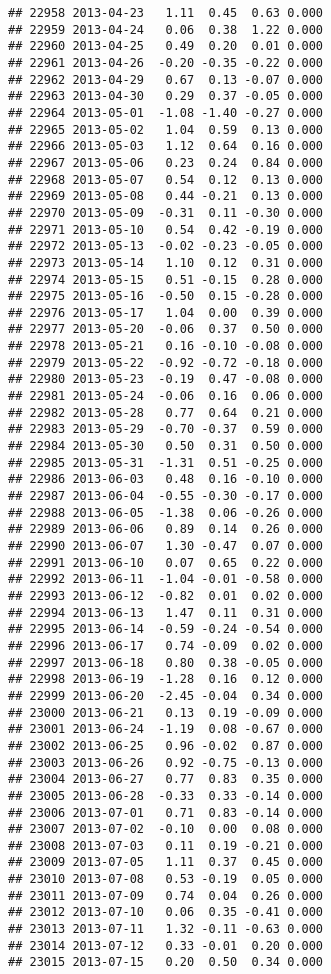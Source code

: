 \documentclass[
]{article}
\begin{document}
\begin{verbatim}
## 22958 2013-04-23   1.11  0.45  0.63 0.000
## 22959 2013-04-24   0.06  0.38  1.22 0.000
## 22960 2013-04-25   0.49  0.20  0.01 0.000
## 22961 2013-04-26  -0.20 -0.35 -0.22 0.000
## 22962 2013-04-29   0.67  0.13 -0.07 0.000
## 22963 2013-04-30   0.29  0.37 -0.05 0.000
## 22964 2013-05-01  -1.08 -1.40 -0.27 0.000
## 22965 2013-05-02   1.04  0.59  0.13 0.000
## 22966 2013-05-03   1.12  0.64  0.16 0.000
## 22967 2013-05-06   0.23  0.24  0.84 0.000
## 22968 2013-05-07   0.54  0.12  0.13 0.000
## 22969 2013-05-08   0.44 -0.21  0.13 0.000
## 22970 2013-05-09  -0.31  0.11 -0.30 0.000
## 22971 2013-05-10   0.54  0.42 -0.19 0.000
## 22972 2013-05-13  -0.02 -0.23 -0.05 0.000
## 22973 2013-05-14   1.10  0.12  0.31 0.000
## 22974 2013-05-15   0.51 -0.15  0.28 0.000
## 22975 2013-05-16  -0.50  0.15 -0.28 0.000
## 22976 2013-05-17   1.04  0.00  0.39 0.000
## 22977 2013-05-20  -0.06  0.37  0.50 0.000
## 22978 2013-05-21   0.16 -0.10 -0.08 0.000
## 22979 2013-05-22  -0.92 -0.72 -0.18 0.000
## 22980 2013-05-23  -0.19  0.47 -0.08 0.000
## 22981 2013-05-24  -0.06  0.16  0.06 0.000
## 22982 2013-05-28   0.77  0.64  0.21 0.000
## 22983 2013-05-29  -0.70 -0.37  0.59 0.000
## 22984 2013-05-30   0.50  0.31  0.50 0.000
## 22985 2013-05-31  -1.31  0.51 -0.25 0.000
## 22986 2013-06-03   0.48  0.16 -0.10 0.000
## 22987 2013-06-04  -0.55 -0.30 -0.17 0.000
## 22988 2013-06-05  -1.38  0.06 -0.26 0.000
## 22989 2013-06-06   0.89  0.14  0.26 0.000
## 22990 2013-06-07   1.30 -0.47  0.07 0.000
## 22991 2013-06-10   0.07  0.65  0.22 0.000
## 22992 2013-06-11  -1.04 -0.01 -0.58 0.000
## 22993 2013-06-12  -0.82  0.01  0.02 0.000
## 22994 2013-06-13   1.47  0.11  0.31 0.000
## 22995 2013-06-14  -0.59 -0.24 -0.54 0.000
## 22996 2013-06-17   0.74 -0.09  0.02 0.000
## 22997 2013-06-18   0.80  0.38 -0.05 0.000
## 22998 2013-06-19  -1.28  0.16  0.12 0.000
## 22999 2013-06-20  -2.45 -0.04  0.34 0.000
## 23000 2013-06-21   0.13  0.19 -0.09 0.000
## 23001 2013-06-24  -1.19  0.08 -0.67 0.000
## 23002 2013-06-25   0.96 -0.02  0.87 0.000
## 23003 2013-06-26   0.92 -0.75 -0.13 0.000
## 23004 2013-06-27   0.77  0.83  0.35 0.000
## 23005 2013-06-28  -0.33  0.33 -0.14 0.000
## 23006 2013-07-01   0.71  0.83 -0.14 0.000
## 23007 2013-07-02  -0.10  0.00  0.08 0.000
## 23008 2013-07-03   0.11  0.19 -0.21 0.000
## 23009 2013-07-05   1.11  0.37  0.45 0.000
## 23010 2013-07-08   0.53 -0.19  0.05 0.000
## 23011 2013-07-09   0.74  0.04  0.26 0.000
## 23012 2013-07-10   0.06  0.35 -0.41 0.000
## 23013 2013-07-11   1.32 -0.11 -0.63 0.000
## 23014 2013-07-12   0.33 -0.01  0.20 0.000
## 23015 2013-07-15   0.20  0.50  0.34 0.000

\end{verbatim}
\end{document}
